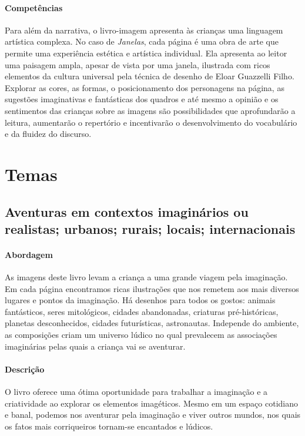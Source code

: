 \documentclass[11pt]{extarticle}
\begin{document}
\paragraph{Competências} 
Para além da narrativa, o livro-imagem 
apresenta às crianças uma linguagem artística complexa. No caso de 
\textit{Janelas}, cada página é uma obra de arte que permite 
uma experiência estética e artística individual. Ela apresenta ao leitor 
uma paisagem ampla, apesar de vista por uma janela, ilustrada com ricos elementos da cultura universal pela técnica de desenho de 
Eloar Guazzelli Filho. Explorar as cores, as formas, o posicionamento dos personagens 
na página, as sugestões imaginativas e fantásticas dos quadros e até mesmo a opinião e os sentimentos das crianças sobre as imagens 
são possibilidades que aprofundarão a leitura, aumentarão o repertório 
e incentivarão o desenvolvimento do vocabulário e da fluidez do discurso. 



\section{Temas}

\subsection{Aventuras em contextos imaginários ou realistas; urbanos; rurais; locais; internacionais}

\paragraph{Abordagem} As imagens deste livro levam a criança a uma grande viagem pela imaginação. Em cada página encontramos ricas ilustrações que nos remetem aos mais diversos lugares e pontos da imaginação. Há desenhos para todos os gostos: animais fantásticos, seres mitológicos, cidades abandonadas, criaturas pré-históricas, planetas desconhecidos, cidades futurísticas, astronautas. Independe do ambiente, as composições criam um universo lúdico no qual prevalecem as associações imaginárias pelas quais a criança vai se aventurar.

\paragraph{Descrição} O livro oferece uma ótima oportunidade para trabalhar a imaginação e a criatividade ao explorar os elementos imagéticos. Mesmo em um espaço cotidiano e banal, podemos nos aventurar pela imaginação e viver outros mundos, nos quais os fatos mais corriqueiros tornam-se encantados e lúdicos.
\end{document}
